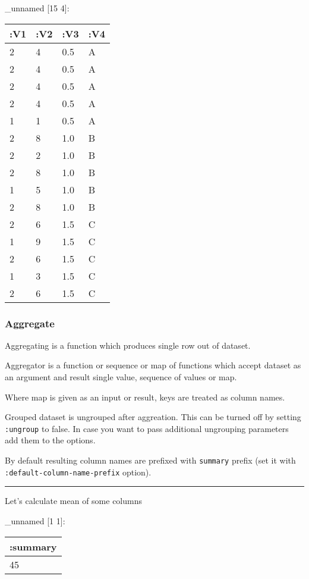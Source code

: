 \documentclass[]{article}
\newenvironment{Shaded}{\begin{snugshade}}{\end{snugshade}}
\newcommand{\AttributeTok}[1]{\textcolor[rgb]{0.77,0.63,0.00}{#1}}
\newcommand{\KeywordTok}[1]{\textcolor[rgb]{0.13,0.29,0.53}{\textbf{#1}}}
\newcommand{\NormalTok}[1]{#1}
\newcommand{\VariableTok}[1]{\textcolor[rgb]{0.00,0.00,0.00}{#1}}
\begin{document}
\_unnamed {[}15 4{]}:

\begin{longtable}[]{@{}llll@{}}
\toprule
:V1 & :V2 & :V3 & :V4\tabularnewline
\midrule
\endhead
2 & 4 & 0.5 & A\tabularnewline
2 & 4 & 0.5 & A\tabularnewline
2 & 4 & 0.5 & A\tabularnewline
2 & 4 & 0.5 & A\tabularnewline
1 & 1 & 0.5 & A\tabularnewline
2 & 8 & 1.0 & B\tabularnewline
2 & 2 & 1.0 & B\tabularnewline
2 & 8 & 1.0 & B\tabularnewline
1 & 5 & 1.0 & B\tabularnewline
2 & 8 & 1.0 & B\tabularnewline
2 & 6 & 1.5 & C\tabularnewline
1 & 9 & 1.5 & C\tabularnewline
2 & 6 & 1.5 & C\tabularnewline
1 & 3 & 1.5 & C\tabularnewline
2 & 6 & 1.5 & C\tabularnewline
\bottomrule
\end{longtable}

\hypertarget{aggregate}{%
\subsubsection{Aggregate}\label{aggregate}}

Aggregating is a function which produces single row out of dataset.

Aggregator is a function or sequence or map of functions which accept
dataset as an argument and result single value, sequence of values or
map.

Where map is given as an input or result, keys are treated as column
names.

Grouped dataset is ungrouped after aggreation. This can be turned off by
setting \texttt{:ungroup} to false. In case you want to pass additional
ungrouping parameters add them to the options.

By default resulting column names are prefixed with \texttt{summary}
prefix (set it with \texttt{:default-column-name-prefix} option).

\begin{center}\rule{0.5\linewidth}{0.5pt}\end{center}

Let's calculate mean of some columns

\begin{Shaded}
\end{Shaded}

\_unnamed {[}1 1{]}:

\begin{longtable}[]{@{}l@{}}
\toprule
:summary\tabularnewline
\midrule
\endhead
45\tabularnewline
\bottomrule
\end{longtable}
\end{document}
